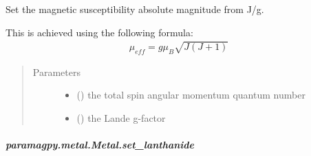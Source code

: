 \documentclass[a4paper,10pt,english,openany,oneside]{sphinxmanual}
\begin{document}
\begin{fulllineitems}
\begin{fulllineitems}
\begin{fulllineitems}
\label{\detokenize{reference/generated/paramagpy.metal.Metal.set_Jg:paramagpy.metal.Metal.set_Jg}}
Set the magnetic susceptibility absolute magnitude from J/g.

This is achieved using the following formula:
\begin{equation*}
\begin{split}\mu_{eff}=g\mu_B\sqrt{J(J+1)}\end{split}
\end{equation*}\begin{quote}\begin{description}
\item[{Parameters}] \leavevmode\begin{itemize}
\item {} 
 () \textendash{} the total spin angular momentum quantum number

\item {} 
 (\sphinxstyleliteralemphasis{\sphinxupquote{, }}) \textendash{} the Lande g-factor

\end{itemize}

\end{description}\end{quote}

\end{fulllineitems}



\subparagraph{paramagpy.metal.Metal.set\_lanthanide}
\label{\detokenize{reference/generated/paramagpy.metal.Metal.set_lanthanide:paramagpy-metal-metal-set-lanthanide}}\label{\detokenize{reference/generated/paramagpy.metal.Metal.set_lanthanide::doc}}


\end{fulllineitems}
\end{fulllineitems}
\end{document}

